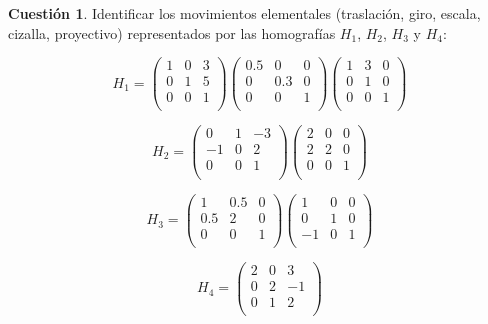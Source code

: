 \documentclass[a4paper, 11pt]{article}
\theoremstyle{definition}
\newtheorem{cuestion}{Cuestión}
\begin{document}
  \begin{cuestion}
    Identificar los movimientos elementales (traslación, giro, escala,
    cizalla, proyectivo) representados por las homografías $H_1$, $H_2$, $H_3$ y $H_4$:

    \[
    H_1 =
    \left(
    \begin{array}{ccc}
        1 & 0 & 3 \\
        0 & 1 & 5 \\
        0 & 0 & 1 \\
    \end{array}
    \right)
    \left(
    \begin{array}{ccc}
        0.5 & 0 & 0 \\
        0 & 0.3 & 0 \\
        0 & 0 & 1 \\
    \end{array}
    \right)
    \left(
    \begin{array}{ccc}
        1 & 3 & 0 \\
        0 & 1 & 0 \\
        0 & 0 & 1 \\
    \end{array}
    \right)
    \]

    \[
    H_2 =
    \left(
    \begin{array}{ccc}
        0 & 1 & -3 \\
        -1 & 0 & 2 \\
        0 & 0 & 1 \\
    \end{array}
    \right)
    \left(
    \begin{array}{ccc}
        2 & 0 & 0 \\
        2 & 2 & 0 \\
        0 & 0 & 1 \\
    \end{array}
    \right)
    \]

    \[
    H_3 =
    \left(
    \begin{array}{ccc}
        1 & 0.5 & 0 \\
        0.5 & 2 & 0 \\
        0 & 0 & 1 \\
    \end{array}
    \right)
    \left(
    \begin{array}{ccc}
        1 & 0 & 0 \\
        0 & 1 & 0 \\
        -1 & 0 & 1 \\
    \end{array}
    \right)
    \]

    \[
    H_4 =
    \left(
    \begin{array}{ccc}
        2 & 0 & 3 \\
        0 & 2 & -1 \\
        0 & 1 & 2 \\
    \end{array}
    \right)
    \] \\

  \end{cuestion}
\end{document}
